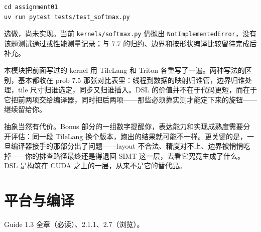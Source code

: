 \documentclass[11pt,a4paper,fontset=none]{ctexart}
\begin{document}
\begin{lstlisting}
cd assignment01
uv run pytest tests/test_softmax.py
\end{lstlisting}

\begin{tcolorbox}[title={7.8 进度记录}]
选做，尚未实现。当前 \texttt{kernels/softmax.py} 仍抛出 \texttt{NotImplementedError}，没有该题测试通过或性能测量记录；与 7.7 的归约、边界和按形状编译比较留待完成后补充。
\end{tcolorbox}

\begin{lookback}
本模块把前面写过的 kernel 用 TileLang 和 Triton 各重写了一遍。两种写法的区别，基本都收在 prob 7.5 那张对比表里：线程到数据的映射归谁管，边界归谁处理，tile 尺寸归谁选定，同步又归谁插入。DSL 的价值并不在于代码更短，而在于它把前两项交给编译器，同时把后两项——那些必须靠实测才能定下来的旋钮——继续留给你。

抽象当然有代价。Bonus 部分的一组数字提醒你，表达能力和实现成熟度需要分开评估：同一段 TileLang 换个版本，跑出的结果就可能不一样。更关键的是，一旦编译器接手的那部分出了问题——layout 不合法、精度对不上、边界被悄悄吃掉——你的排查路径最终还是得退回 SIMT 这一层，去看它究竟生成了什么。DSL 是构筑在 CUDA 之上的一层，从来不是它的替代品。
\end{lookback}

\section{平台与编译}

\begin{reading}
Guide 1.3 全章（必读）、2.1.1、2.7（浏览）。
\end{reading}
\end{document}
